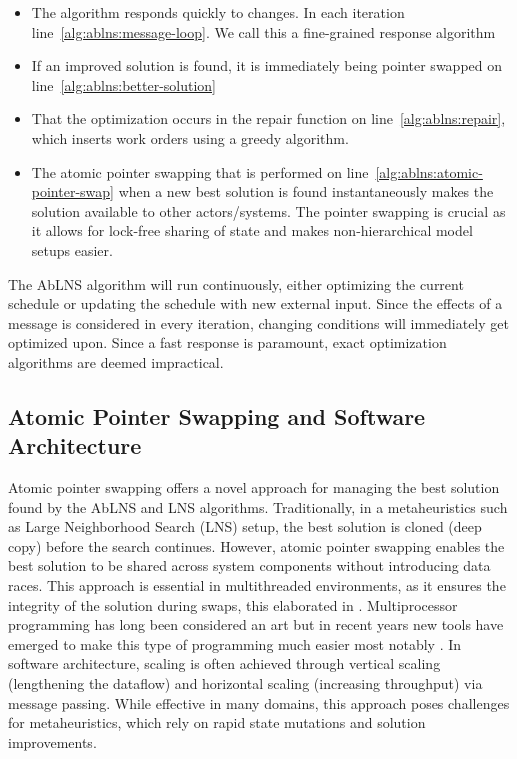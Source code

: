 \begin{itemize}
    \item The algorithm responds quickly to changes. In each iteration
		line~\ref{alg:ablns:message-loop}. We
		call this a fine-grained response algorithm     
	\item If an improved
		solution is found, it is immediately being pointer swapped
		on line~\ref{alg:ablns:better-solution}
	\item That the optimization occurs in the repair function on
		line~\ref{alg:ablns:repair},
		which inserts work orders using a greedy algorithm.  	
	\item The atomic pointer swapping that is performed on
		line~\ref{alg:ablns:atomic-pointer-swap} when a
		new best solution is found instantaneously makes the solution available to other
		actors/systems. The pointer swapping is crucial as it allows for lock-free
		sharing of state and makes non-hierarchical model setups easier.
\end{itemize}

The AbLNS algorithm will run continuously, either optimizing the current
schedule or updating the schedule with new external input. Since the
effects of a message is considered in every iteration, changing conditions
will immediately get optimized upon. Since a fast response is paramount, exact
optimization algorithms are deemed impractical.

\subsection{Atomic Pointer Swapping and Software Architecture}
Atomic pointer swapping offers a novel approach for managing the best
solution found by the AbLNS and LNS algorithms.
Traditionally, in a metaheuristics such as Large Neighborhood Search (LNS)
setup, the best solution is cloned (deep copy) before the search continues. However, atomic
pointer swapping enables the best solution to be shared across system components
without introducing data races. This approach is essential in multithreaded
environments, as it ensures the integrity of the solution during swaps, this elaborated in 
\citep{herlihy2020art}. Multiprocessor programming has long been considered an art but 
in recent years new tools have emerged to make this type of programming much 
easier most notably \citep{noauthor_rust_nodate}. In
software architecture, scaling is often achieved through vertical scaling
(lengthening the dataflow) and horizontal scaling (increasing throughput)
via message passing. While effective in many domains, this approach poses
challenges for metaheuristics, which rely on rapid state mutations and solution
improvements.


